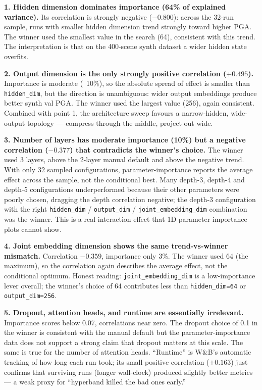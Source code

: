 \vspace{0.5em}

\textbf{1. Hidden dimension dominates importance (64\% of explained variance).} Its correlation is strongly negative ($-0.800$): across the 32-run sample, runs with smaller hidden dimension trend strongly toward higher PGA. The winner used the smallest value in the search (64), consistent with this trend. The interpretation is that on the 400-scene synth dataset a wider hidden state overfits.

\textbf{2. Output dimension is the only strongly positive correlation ($+0.495$).} Importance is moderate (~10\%), so the absolute spread of effect is smaller than \texttt{hidden\_dim}, but the direction is unambiguous: wider output embeddings produce better synth val PGA. The winner used the largest value (256), again consistent. Combined with point 1, the architecture sweep favours a narrow-hidden, wide-output topology --- compress through the middle, project out wide.

\textbf{3. Number of layers has moderate importance (10\%) but a negative correlation ($-0.377$) that contradicts the winner's choice.} The winner used 3 layers, above the 2-layer manual default and above the negative trend. With only 32 sampled configurations, parameter-importance reports the average effect across the sample, not the conditional best. Many depth-3, depth-4 and depth-5 configurations underperformed because their other parameters were poorly chosen, dragging the depth correlation negative; the depth-3 configuration with the right \texttt{hidden\_dim} / \texttt{output\_dim} / \texttt{joint\_embedding\_dim} combination was the winner. This is a real interaction effect that 1D parameter importance plots cannot show.

\textbf{4. Joint embedding dimension shows the same trend-vs-winner mismatch.} Correlation $-0.359$, importance only 3\%. The winner used 64 (the maximum), so the correlation again describes the average effect, not the conditional optimum. Honest reading: \texttt{joint\_embedding\_dim} is a low-importance lever overall; the winner's choice of 64 contributes less than \texttt{hidden\_dim=64} or \texttt{output\_dim=256}.

\textbf{5. Dropout, attention heads, and runtime are essentially irrelevant.} Importance scores below 0.07, correlations near zero. The dropout choice of 0.1 in the winner is consistent with the manual default but the parameter-importance data does not support a strong claim that dropout matters at this scale. The same is true for the number of attention heads. ``Runtime'' is W\&B's automatic tracking of how long each run took; its small positive correlation ($+0.163$) just confirms that surviving runs (longer wall-clock) produced slightly better metrics --- a weak proxy for ``hyperband killed the bad ones early.''

